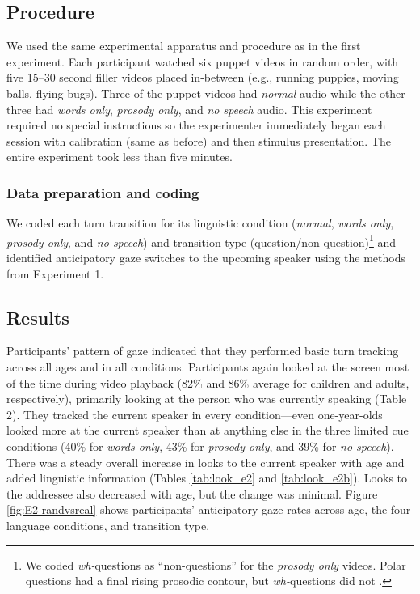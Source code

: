 \documentclass[authoryear, 12pt]{elsarticle}
\begin{document}
\subsection{Procedure}
We used the same experimental apparatus and procedure as in the first experiment. Each participant watched six puppet videos in random order, with five 15--30 second filler videos placed in-between (e.g., running puppies, moving balls, flying bugs). Three of the puppet videos had \textit{normal} audio while the other three had \textit{words only}, \textit{prosody only}, and \textit{no speech} audio. This experiment required no special instructions so the experimenter immediately began each session with calibration (same as before) and then stimulus presentation. The entire experiment took less than five minutes.

\subsubsection{Data preparation and coding}
We coded each turn transition for its linguistic condition (\textit{normal}, \textit{words only}, \textit{prosody only}, and \textit{no speech}) and transition type (question/non-question)\footnote{We coded \textit{wh-}questions as ``non-questions'' for the \textit{prosody only} videos. Polar questions had a final rising prosodic contour, but \textit{wh-}questions did not  \citep{hedberg2010}.} and identified anticipatory gaze switches to the upcoming speaker using the methods from Experiment 1.

\subsection{Results}
\label{sec:results2}

Participants' pattern of gaze indicated that they performed basic turn tracking across all ages and in all conditions. Participants again looked at the screen most of the time during video playback (82\% and 86\% average for children and adults, respectively), primarily looking at the person who was currently speaking (Table 2). They tracked the current speaker in every condition---even one-year-olds looked more at the current speaker than at anything else in the three limited cue conditions (40\% for \textit{words only}, 43\% for \textit{prosody only}, and 39\% for \textit{no speech}). There was a steady overall increase in looks to the current speaker with age and added linguistic information (Tables \ref{tab:look_e2} and \ref{tab:look_e2b}). Looks to the addressee also decreased with age, but the change was minimal. Figure \ref{fig:E2-randvsreal} shows participants' anticipatory gaze rates across age, the four language conditions, and transition type.
\end{document}
